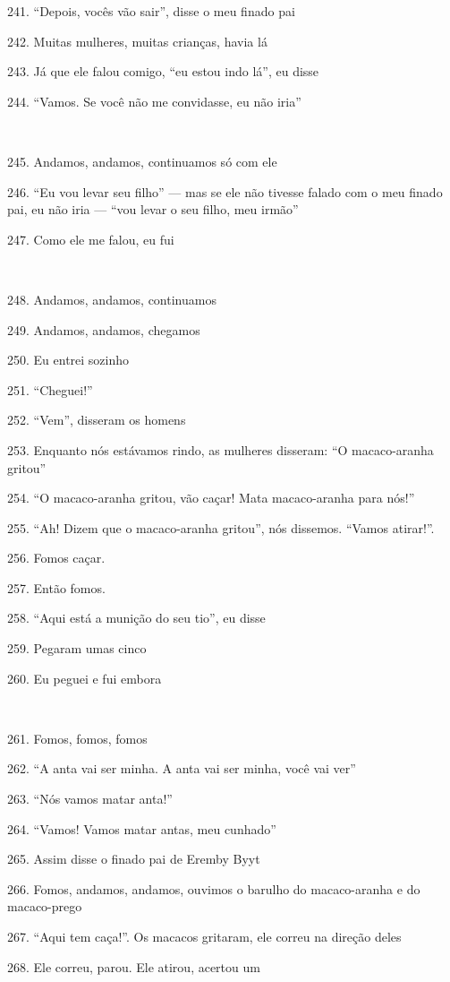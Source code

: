 241. ``Depois, vocês vão sair'', disse o meu finado pai

242. Muitas mulheres, muitas crianças, havia lá

243. Já que ele falou comigo, ``eu estou indo lá'', eu disse

244. ``Vamos. Se você não me convidasse, eu não iria''

~

245. Andamos, andamos, continuamos só com ele

246. ``Eu vou levar seu filho'' --- mas se ele não tivesse falado com o meu
finado pai, eu não iria --- ``vou levar o seu filho, meu irmão''

247. Como ele me falou, eu fui

~

248. Andamos, andamos, continuamos

249. Andamos, andamos, chegamos

250. Eu entrei sozinho

251. ``Cheguei!''

252. ``Vem'', disseram os homens

253. Enquanto nós estávamos rindo, as mulheres disseram: ``O macaco-aranha gritou''

254. ``O macaco-aranha gritou, vão caçar! Mata macaco-aranha para nós!''

255. ``Ah! Dizem que o macaco-aranha gritou'', nós dissemos. ``Vamos atirar!''.

256. Fomos caçar.

257. Então fomos.

258. ``Aqui está a munição do seu tio'', eu disse

259. Pegaram umas cinco

260. Eu peguei e fui embora

~

261. Fomos, fomos, fomos

262. ``A anta vai ser minha. A anta vai ser minha, você vai ver''

263. ``Nós vamos matar anta!''

264. ``Vamos! Vamos matar antas, meu cunhado''

265. Assim disse o finado pai de Eremby Byyt

266. Fomos, andamos, andamos, ouvimos o barulho do macaco-aranha e do
macaco-prego

267. ``Aqui tem caça!''. Os macacos gritaram, ele correu na direção deles

268. Ele correu, parou. Ele atirou, acertou um

